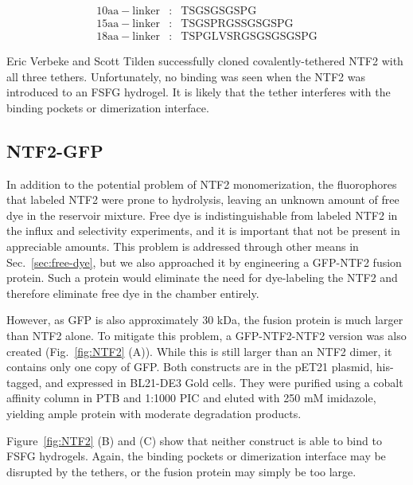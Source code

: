 \begin{align*}
\mathrm{10aa-linker}&:&\mathrm{TSGSGSGSPG}\\
\mathrm{15aa-linker}&:&\mathrm{TSGSPRGSSGSGSPG}\\
\mathrm{18aa-linker}&:&\mathrm{TSPGLVSRGSGSGSGSPG}
\end{align*}

Eric Verbeke and Scott Tilden successfully cloned covalently-tethered NTF2 with all three tethers.  Unfortunately, no binding was seen when the NTF2 was introduced to an FSFG hydrogel.  It is likely that the tether interferes with the binding pockets or dimerization interface.

\subsection{NTF2-GFP}

In addition to the potential problem of NTF2 monomerization, the fluorophores that labeled NTF2 were prone to hydrolysis, leaving an unknown amount of free dye in the reservoir mixture.  Free dye is indistinguishable from labeled NTF2 in the influx and selectivity experiments, and it is important that not be present in appreciable amounts.  This problem is addressed through other means in Sec.~\ref{sec:free-dye}, but we also approached it by engineering a GFP-NTF2 fusion protein.  Such a protein would eliminate the need for dye-labeling the NTF2 and therefore eliminate free dye in the chamber entirely.  

However, as GFP is also approximately 30 kDa, the fusion protein is much larger than NTF2 alone.  To mitigate this problem, a GFP-NTF2-NTF2 version was also created (Fig.~\ref{fig:NTF2} (A)).  While this is still larger than an NTF2 dimer, it contains only one copy of GFP.  Both constructs are in the pET21 plasmid, his-tagged, and expressed in BL21-DE3 Gold cells.  They were purified using a cobalt affinity column in PTB and 1:1000 PIC and eluted with 250 mM imidazole, yielding ample protein with moderate degradation products.

Figure~\ref{fig:NTF2} (B) and (C) show that neither construct is able to bind to FSFG hydrogels.  Again, the binding pockets or dimerization interface may be disrupted by the tethers, or the fusion protein may simply be too large.

